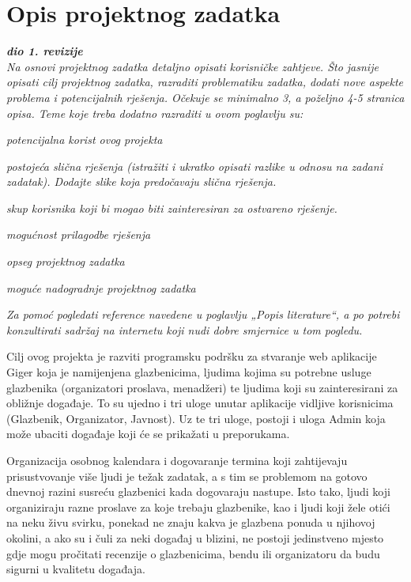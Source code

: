 \chapter{Opis projektnog zadatka}
		
		\textbf{\textit{dio 1. revizije}}\\
		
		\textit{Na osnovi projektnog zadatka detaljno opisati korisničke zahtjeve. Što jasnije opisati cilj projektnog zadatka, razraditi problematiku zadatka, dodati nove aspekte problema i potencijalnih rješenja. Očekuje se minimalno 3, a poželjno 4-5 stranica opisa.	Teme koje treba dodatno razraditi u ovom poglavlju su:}
		\begin{packed_item}
			\item \textit{potencijalna korist ovog projekta}
			\item \textit{postojeća slična rješenja (istražiti i ukratko opisati razlike u odnosu na zadani zadatak). Dodajte slike koja predočavaju slična rješenja.}
			\item \textit{skup korisnika koji bi mogao biti zainteresiran za ostvareno rješenje.}
			\item \textit{mogućnost prilagodbe rješenja }
			\item \textit{opseg projektnog zadatka}
			\item \textit{moguće nadogradnje projektnog zadatka}
		\end{packed_item}
		
		\textit{Za pomoć pogledati reference navedene u poglavlju „Popis literature“, a po potrebi konzultirati sadržaj na internetu koji nudi dobre smjernice u tom pogledu.}
		\eject
		
		Cilj ovog projekta je razviti programsku podršku za stvaranje web aplikacije Giger koja je namijenjena glazbenicima, ljudima kojima su potrebne usluge glazbenika (organizatori proslava, menadžeri) te ljudima koji su zainteresirani za obližnje događaje. To su ujedno i tri uloge unutar aplikacije vidljive korisnicima (Glazbenik, Organizator, Javnost). Uz te tri uloge, postoji i uloga Admin koja može ubaciti događaje koji će se prikažati u preporukama.
		
		Organizacija osobnog kalendara i dogovaranje termina koji zahtijevaju prisustvovanje više ljudi je težak zadatak, a s tim se problemom na gotovo dnevnoj razini susreću glazbenici kada dogovaraju nastupe. Isto tako, ljudi koji organiziraju razne proslave za koje trebaju glazbenike, kao i ljudi koji žele otići na neku živu svirku, ponekad ne znaju kakva je glazbena ponuda u njihovoj okolini, a ako su i čuli za neki događaj u blizini, ne postoji jedinstveno mjesto gdje mogu pročitati recenzije o glazbenicima, bendu ili organizatoru da budu sigurni u kvalitetu događaja.
		
